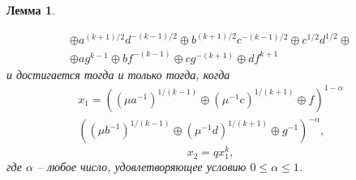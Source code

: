 \documentclass{spisok-article}
\newtheorem{lemma}{Лемма}
\begin{document}
\begin{lemma}
\begin{enumerate}
\begin{multline*}
		\oplus
		a^{(k+1)/2}d^{-(k-1)/2}
		\oplus
		b^{(k+1)/2}c^{-(k-1)/2}
		\oplus
		c^{1/2}d^{1/2}
		\oplus
		\\
		\oplus
		ag^{k-1}
		\oplus
		bf^{-(k-1)}
		\oplus
		cg^{-(k+1)}
		\oplus
		df^{k+1}
		\end{multline*}
		и достигается тогда и только тогда, когда
		\begin{multline*}
		x_{1}
		=
		((\mu a^{-1})^{1/(k-1)}\oplus(\mu^{-1}c)^{1/(k+1)}\oplus f)^{1-\alpha}\\
		((\mu b^{-1})^{1/(k-1)}\oplus(\mu^{-1}d)^{1/(k+1)}\oplus g^{-1})^{-\alpha},
		\end{multline*}
		\begin{equation*}
		x_{2}
		=
		qx_{1}^{k},
		\end{equation*}
		где $\alpha$ -- любое число, удовлетворяющее условию $0\leq\alpha\leq1$.
	\end{enumerate}
\end{lemma}
\end{document}
